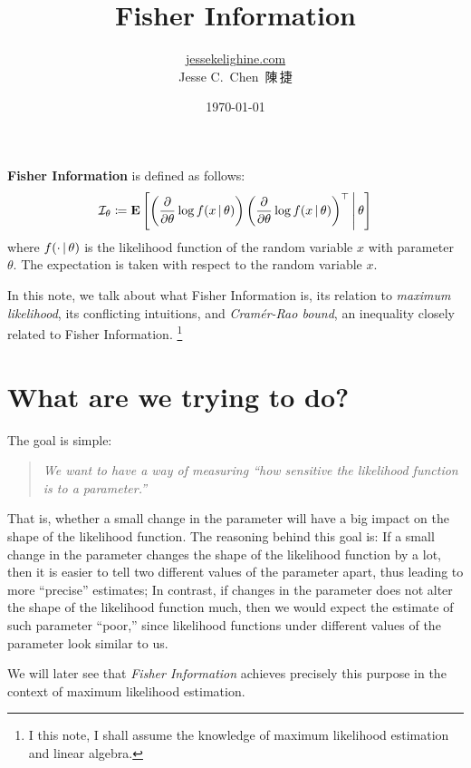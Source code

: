 \documentclass[a4paper]{article}
\title{Fisher Information}
\author{\href{https://jessekelighine.com}{jessekelighine.com}\\Jesse C.\ Chen\ 陳\,捷}
\date{\today}
\begin{document}
\maketitle

\noindent
\textbf{Fisher Information} is defined as follows:
\begin{align*}
	\mathcal{I}_{\theta}
	\coloneqq
	\E
	\left[
	\left(
	\frac{\partial}{\partial\theta}\log f(x\given\theta)
	\right)
	\left(
	\frac{\partial}{\partial\theta}\log f(x\given\theta)
	\right)\T
	\given[\middle]
	\theta
	\right]
\end{align*}
where $f(\cdot\given\theta)$ is the likelihood function of the random variable $x$ with parameter $\theta$.
The expectation is taken with respect to the random variable $x$.

In this note,
we talk about what Fisher Information is,
its relation to \emph{maximum likelihood},
its conflicting intuitions,
and \emph{Cramér-Rao bound}, an inequality closely related to Fisher Information.
\footnote{
	I this note, I shall assume the knowledge of maximum likelihood estimation and linear algebra.
}

\section{What are we trying to do?}

The goal is simple:
\begin{quote}
	\textit{We want to have a way of measuring ``how sensitive the likelihood function is to a parameter.''}
\end{quote}
That is,
whether a small change in the parameter will have a big impact on the shape of the likelihood function.
The reasoning behind this goal is:
If a small change in the parameter changes the shape of the likelihood function by a lot,
then it is easier to tell two different values of the parameter apart,
thus leading to more ``precise'' estimates;
In contrast, if changes in the parameter does not alter the shape of the likelihood function much,
then we would expect the estimate of such parameter ``poor,''
since likelihood functions under different values of the parameter look similar to us.

We will later see that \emph{Fisher Information} achieves precisely this purpose
in the context of maximum likelihood estimation.
\end{document}
